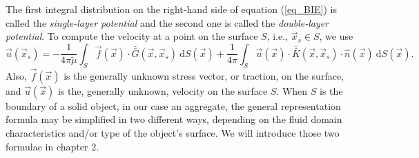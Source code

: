The first integral distribution on the right-hand side of equation (\ref{eq_BIE}) is called the \textit{single-layer potential} and the second one is called the \textit{double-layer potential}. 
To compute the velocity at a point on the surface $S$, i.e., $ \vec{x}_s \in S$, we use 
\begin{equation}
   \vec{u}(\vec{x}_s) = - \frac{1}{4 \pi {\tilde{\mu}}} \int_S  \vec{f}(\vec{x}) \cdot \bar{\bar{G}}(\vec{x},\vec{x}_s) \ \text{d}S(\vec{x}) 
+ \frac{1}{4 \pi} 
\int_S
\vec{u}(\vec{x}) \cdot  \bar{\bar{K}}(\vec{x},\vec{x}_s)  
\cdot \hat{n} ( \vec{x})
\ \text{d}S(\vec{x}).
\label{eq_BIE_onS}
\end{equation}
Also, $\vec{f}(\vec{x})$ is the generally unknown  stress vector, or traction, on the surface, and $\vec{u}(\vec{x})$ is the, generally unknown, velocity on the surface $S$. 
When $S$ is the boundary of a solid object, in our case an aggregate, the general representation formula may be simplified in two different ways, depending on the fluid domain characteristics and/or type of the object's surface. We will introduce those two formulae in chapter 2. 



